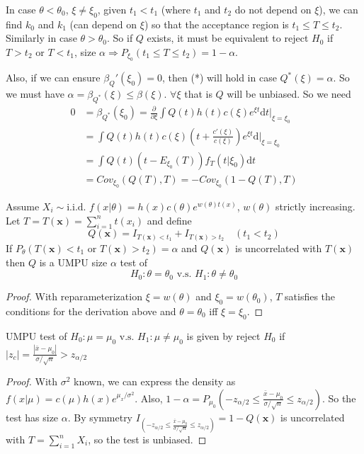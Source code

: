 \documentclass[english, 11pt]{article}
\begin{document}
In case $\theta<\theta_0$, $\xi\not=\xi_0$, given $t_1<t_1$ (where $t_1$ and $t_2$ do not depend on $\xi$), we can find $k_0$ and $k_1$ (can depend on $\xi$) so that the acceptance region is $t_1\leqslant T \leqslant t_2$. Similarly in case $\theta>\theta_0$. So if $Q$ exists, it must be equivalent to reject $H_0$ if $T>t_2$ or $T<t_1$, size $\alpha\Rightarrow P_{\xi_0}(t_1\leqslant T\leqslant t_2)=1-\alpha$.

Also, if we can ensure $\beta_Q'(\xi_0)=0$, then (*) will hold in case $Q^*(\xi)=\alpha$. So we must have $\alpha=\beta_{Q^*}(\xi)\leqslant\beta(\xi)$. $\forall \xi$ that is $Q$ will be unbiased. So we need
$$
\begin{aligned}
0&=\beta_{Q^*}(\xi_0)=\frac{\partial}{\partial\xi}\int Q(t)h(t)c(\xi)e^{\xi t}\mathrm{d}t\big|_{\xi=\xi_0}\\
&=\int Q(t)h(t)c(\xi)\left(t+\frac{c'(\xi)}{c(\xi)}\right)e^{\xi t}\mathrm{d}\big|_{\xi=\xi_0}\\
&=\int Q(t)\left(t-E_{\xi_0}(T)\right)f_T(t|\xi_0)\mathrm{d}t\\
&=Cov_{\xi_0}(Q(T),T)=-Cov_{\xi_0}(1-Q(T), T)
\end{aligned}
$$

\begin{thrm}\label{thrm:522} Assume $X_i\sim \text{i.i.d. }f(x|\theta)=h(x)c(\theta)e^{w(\theta)t(x)}$, $w(\theta)$ strictly increasing. Let $T=T(\bm{x})=\sum_{i=1}^nt(x_i)$ and define
$$
Q(\bm{x})=I_{T(\bm{x})<t_1}+I_{T(\bm{x})>t_2}\quad (t_1<t_2)
$$
If $P_\theta(T(\bm{x})<t_1\text{ or }T(\bm{x})>t_2)=\alpha$ and $Q(\bm{x})$ is uncorrelated with $T(\bm{x})$ then $Q$ is a UMPU size $\alpha$ test of 
$$
H_0:\theta=\theta_0\text{ v.s. }H_1:\theta\not=\theta_0
$$
\end{thrm}
\begin{proof}With reparameterization $\xi=w(\theta)$ and $\xi_0=w(\theta_0)$, $T$ satisfies the conditions for the derivation above and $\theta=\theta_0$ iff $\xi=\xi_0$.
\end{proof}

\begin{thrm}\label{thrm:518ii}
UMPU test of $H_0:\mu=\mu_0\text{ v.s. }H_1:\mu\not=\mu_0$ is given by reject $H_0$ if $|z_c|=\frac{|\bar{x}-\mu_0|}{\sigma/\sqrt{n}}>z_{\alpha/2}$
\end{thrm}
\begin{proof}With $\sigma^2$ known, we can express the density as $f(x|\mu)=c(\mu)h(x)e^{\mu_x/\sigma^2}$. Also, $1-\alpha=P_{\mu_0}\left(-z_{\alpha/2}\leqslant\frac{\bar{x}-\mu_0}{\sigma/\sqrt{n}}\leqslant z_{\alpha/2}\right)$. So the test has size $\alpha$. By symmetry $I_{\left(-z_{\alpha/2}\leqslant\frac{\bar{x}-\mu_0}{\sigma/\sqrt{n}}\leqslant z_{\alpha/2}\right)}=1-Q(\bm{x})$ is uncorrelated with $T=\sum_{i=1}^nX_i$, so the test is unbiased.
\end{proof}
\end{document}
